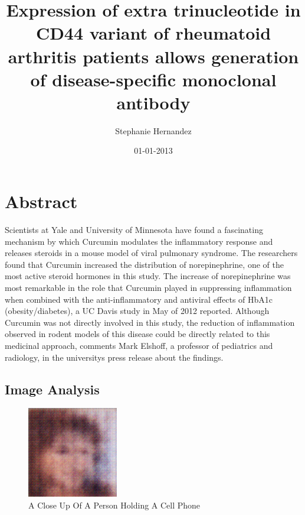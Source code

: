 \documentclass{article}%
\title{Expression of extra trinucleotide in CD44 variant of rheumatoid arthritis patients allows generation of disease{-}specific monoclonal antibody}%
\author{Stephanie Hernandez}%
\affil{INSERM, U895 (quipe 1), Equipe lablise Ligue Contre le Cancer, C3M, 06204 Nice, France}%
\date{01{-}01{-}2013}%
\begin{document}
%
\normalsize%
\maketitle%
\section{Abstract}%
\label{sec:Abstract}%
Scientists at Yale and University of Minnesota have found a fascinating mechanism by which Curcumin modulates the inflammatory response and releases steroids in a mouse model of viral pulmonary syndrome.\newline%
The researchers found that Curcumin increased the distribution of norepinephrine, one of the most active steroid hormones in this study. The increase of norepinephrine was most remarkable in the role that Curcumin played in suppressing inflammation when combined with the anti{-}inflammatory and antiviral effects of HbA1c (obesity/diabetes), a UC Davis study in May of 2012 reported.\newline%
Although Curcumin was not directly involved in this study, the reduction of inflammation observed in rodent models of this disease could be directly related to this medicinal approach, comments Mark Elshoff, a professor of pediatrics and radiology, in the universitys press release about the findings.

%
\subsection{Image Analysis}%
\label{subsec:ImageAnalysis}%


\begin{figure}[h!]%
\centering%
\includegraphics[width=150px]{500_fake_images/samples_5_293.png}%
\caption{A Close Up Of A Person Holding A Cell Phone}%
\end{figure}

%
\end{document}
